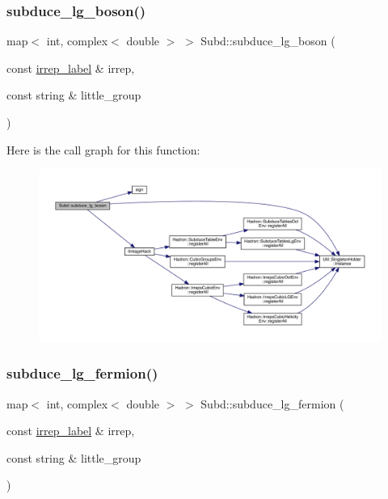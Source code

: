 \subsubsection{\texorpdfstring{subduce\_lg\_boson()}{subduce\_lg\_boson()}}
{\footnotesize\ttfamily map$<$ int, complex$<$ double $>$ $>$ Subd\+::subduce\+\_\+lg\+\_\+boson (\begin{DoxyParamCaption}\item[{const \mbox{\hyperlink{structirrep__label}{irrep\+\_\+label}} \&}]{irrep,  }\item[{const string \&}]{little\+\_\+group }\end{DoxyParamCaption})}

Here is the call graph for this function\+:
\nopagebreak
\begin{figure}[H]
\begin{center}
\leavevmode
\includegraphics[width=350pt]{d8/d2b/namespaceSubd_a5f31b3ef70ad25320a8010ec3017eb04_cgraph}
\end{center}
\end{figure}
\mbox{\label{namespaceSubd_ae7ed68270fb8f7b5f574db245b085586}} 
\subsubsection{\texorpdfstring{subduce\_lg\_fermion()}{subduce\_lg\_fermion()}}
{\footnotesize\ttfamily map$<$ int, complex$<$ double $>$ $>$ Subd\+::subduce\+\_\+lg\+\_\+fermion (\begin{DoxyParamCaption}\item[{const \mbox{\hyperlink{structirrep__label}{irrep\+\_\+label}} \&}]{irrep,  }\item[{const string \&}]{little\+\_\+group }\end{DoxyParamCaption})}

